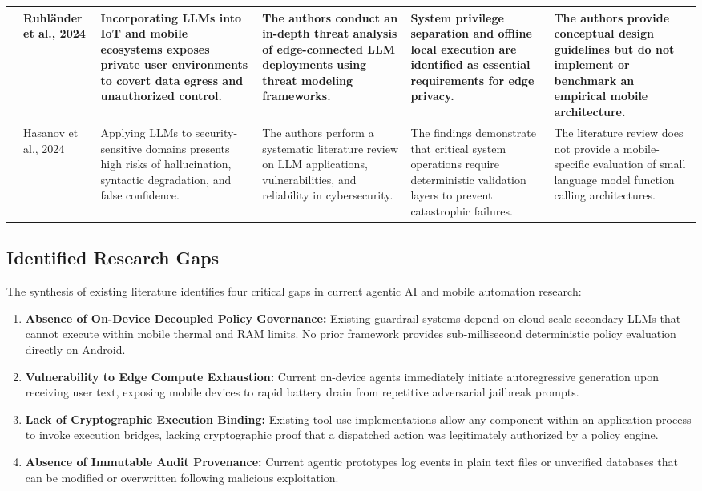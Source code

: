 \begin{center}
\begin{longtable}{|>{\centering\arraybackslash}p{0.55cm}|p{2.0cm}|p{2.7cm}|p{2.8cm}|p{2.7cm}|p{2.7cm}|}
19 & Ruhl{\"a}nder et al., 2024 \cite{ruhlander2024security} & Incorporating LLMs into IoT and mobile ecosystems exposes private user environments to covert data egress and unauthorized control. & The authors conduct an in-depth threat analysis of edge-connected LLM deployments using threat modeling frameworks. & System privilege separation and offline local execution are identified as essential requirements for edge privacy. & The authors provide conceptual design guidelines but do not implement or benchmark an empirical mobile architecture. \\
\hline

20 & Hasanov et al., 2024 \cite{hasanov2024application} & Applying LLMs to security-sensitive domains presents high risks of hallucination, syntactic degradation, and false confidence. & The authors perform a systematic literature review on LLM applications, vulnerabilities, and reliability in cybersecurity. & The findings demonstrate that critical system operations require deterministic validation layers to prevent catastrophic failures. & The literature review does not provide a mobile-specific evaluation of small language model function calling architectures. \\
\hline

\end{longtable}
\end{center}

\subsection{Identified Research Gaps}
The synthesis of existing literature identifies four critical gaps in current agentic AI and mobile automation research:
\begin{enumerate}
    \item \textbf{Absence of On-Device Decoupled Policy Governance:} Existing guardrail systems depend on cloud-scale secondary LLMs that cannot execute within mobile thermal and RAM limits. No prior framework provides sub-millisecond deterministic policy evaluation directly on Android.
    \item \textbf{Vulnerability to Edge Compute Exhaustion:} Current on-device agents immediately initiate autoregressive generation upon receiving user text, exposing mobile devices to rapid battery drain from repetitive adversarial jailbreak prompts.
    \item \textbf{Lack of Cryptographic Execution Binding:} Existing tool-use implementations allow any component within an application process to invoke execution bridges, lacking cryptographic proof that a dispatched action was legitimately authorized by a policy engine.
    \item \textbf{Absence of Immutable Audit Provenance:} Current agentic prototypes log events in plain text files or unverified databases that can be modified or overwritten following malicious exploitation.
\end{enumerate}


